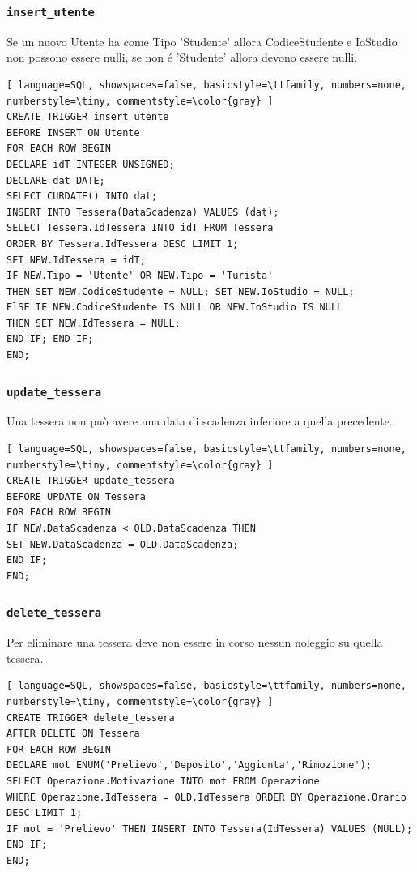 \documentclass[a4paper,twoside]{article}
\begin{document}
\subsubsection{\texttt{insert\_utente}}
Se un nuovo Utente ha come Tipo 'Studente' allora CodiceStudente e IoStudio non possono essere nulli, se non é 'Studente' allora devono essere nulli.
\begin{lstlisting}[ language=SQL, showspaces=false, basicstyle=\ttfamily, numbers=none, numberstyle=\tiny, commentstyle=\color{gray} ]
CREATE TRIGGER insert_utente
BEFORE INSERT ON Utente
FOR EACH ROW BEGIN
DECLARE idT INTEGER UNSIGNED;
DECLARE dat DATE;
SELECT CURDATE() INTO dat;
INSERT INTO Tessera(DataScadenza) VALUES (dat);
SELECT Tessera.IdTessera INTO idT FROM Tessera
ORDER BY Tessera.IdTessera DESC LIMIT 1;
SET NEW.IdTessera = idT;
IF NEW.Tipo = 'Utente' OR NEW.Tipo = 'Turista'
THEN SET NEW.CodiceStudente = NULL; SET NEW.IoStudio = NULL;
ElSE IF NEW.CodiceStudente IS NULL OR NEW.IoStudio IS NULL
THEN SET NEW.IdTessera = NULL;
END IF; END IF;
END;
\end{lstlisting}
\subsubsection{\texttt{update\_tessera}}
Una tessera non può avere una data di scadenza inferiore a quella precedente.
\begin{lstlisting}[ language=SQL, showspaces=false, basicstyle=\ttfamily, numbers=none, numberstyle=\tiny, commentstyle=\color{gray} ]
CREATE TRIGGER update_tessera
BEFORE UPDATE ON Tessera
FOR EACH ROW BEGIN
IF NEW.DataScadenza < OLD.DataScadenza THEN
SET NEW.DataScadenza = OLD.DataScadenza;
END IF;
END;
\end{lstlisting}
\subsubsection{\texttt{delete\_tessera}}
Per eliminare una tessera deve non essere in corso nessun noleggio su quella tessera.
\begin{lstlisting}[ language=SQL, showspaces=false, basicstyle=\ttfamily, numbers=none, numberstyle=\tiny, commentstyle=\color{gray} ]
CREATE TRIGGER delete_tessera
AFTER DELETE ON Tessera
FOR EACH ROW BEGIN
DECLARE mot ENUM('Prelievo','Deposito','Aggiunta','Rimozione');
SELECT Operazione.Motivazione INTO mot FROM Operazione
WHERE Operazione.IdTessera = OLD.IdTessera ORDER BY Operazione.Orario DESC LIMIT 1;
IF mot = 'Prelievo' THEN INSERT INTO Tessera(IdTessera) VALUES (NULL);
END IF;
END;
\end{lstlisting}
\end{document}
